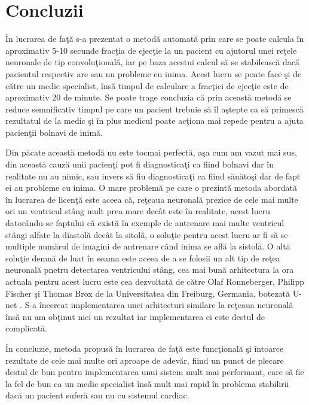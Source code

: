 \chapter{Concluzii}

\^{I}n lucrarea de fa\c{t}\u{a} s-a prezentat o metod\u{a} automat\u{a} prin care se poate calcula \^{i}n aproximativ 5-10 secunde frac\c{t}ia de ejec\c{t}ie la un pacient cu ajutorul unei re\c{t}ele neuronale de tip convolu\c{t}ional\u{a}, iar pe baza acestui calcul s\u{a} se stabileasc\u{a} dac\u{a} pacientul respectiv are sau nu probleme cu inima. Acest lucru se poate face \c{s}i de c\u{a}tre un medic specialist, \^{i}ns\u{a} timpul de calculare a frac\c{t}iei de ejec\c{t}ie este de aproximativ 20 de minute. Se poate trage concluzia c\u{a} prin aceast\u{a} metod\u{a} se reduce semnificativ timpul pe care un pacient trebuie s\u{a} \^{i}l a\c{s}tepte ca s\u{a} primesc\u{a} rezultatul de la medic \c{s}i \^{i}n plus medicul poate ac\c{t}iona mai repede pentru a ajuta pacien\c{t}ii bolnavi de inim\u{a}.

\par

Din p\u{a}cate aceast\u{a} metod\u{a} nu este tocmai perfect\u{a}, a\c{s}a cum am vazut mai sus, din aceast\u{a} cauz\u{a} unii pacien\c{t}i pot fi diagnostica\c{t}i ca fiind bolnavi dar \^{i}n realitate nu au nimic, sau invers s\u{a} fiu diagnostica\c{t}i ca fiind s\u{a}n\u{a}to\c{s}i dar de fapt ei au probleme cu inima. O mare problem\u{a} pe care o prezint\u{a} metoda abordat\u{a} \^{i}n lucrarea de licen\c{t}\u{a} este aceea c\u{a}, re\c{t}eaua neuronal\u{a} prezice de cele mai multe ori un ventricul st\^{a}ng mult prea mare dec\^{a}t este \^{i}n realitate, acest lucru dator\^{a}ndu-se faptului c\u{a} exist\u{a} \^{i}n exemple de antrenare mai multe ventricul st\^{a}ngi alfate la diastol\u{a} dec\^{a}t la sitol\u{a}, o solu\c{t}ie pentru acest lucru ar fi s\u{a} se multiple num\u{a}rul de imagini de antrenare c\^{a}nd inima se afl\u{a} la sistol\u{a}. O alt\u{a} solu\c{t}ie demn\u{a} de luat \^{i}n seama este aceea de a se folosii un alt tip de re\c{t}ea neuronal\u{a} pnetru detectarea ventricului st\^{a}ng, cea mai bun\u{a} arhitectura la ora actuala pentru acest lucru este cea dezvoltat\u{a} de c\u{a}tre Olaf Ronneberger, Philipp Fischer \c{s}i Thomas Brox de la Universitatea din Freiburg, Germania, botezat\u{a} U-net \cite{Unet}. S-a \^{i}ncercat implementarea unei arhitecturi similare la re\c{t}eaua neuronal\u{a} \^{i}ns\u{a} nu am ob\c{t}inut nici un rezultat iar implementarea ei este destul de complicat\u{a}.

\par

\^{I}n concluzie, metoda propus\u{a} \^{i}n lucrarea de fa\c{t}\u{a} este func\c{t}ional\u{a} \c{s}i \^{i}ntoarce rezultate de cele mai multe ori aproape de adev\u{a}r, fiind un punct de plecare destul de bun pentru implementarea unui sistem mult mai performant, care s\u{a} fie la fel de bun ca un medic specialist \^{i}ns\u{a} mult mai rapid \^{i}n problema stabilirii dac\u{a} un pacient sufer\u{a} sau nu cu sistemul cardiac. 